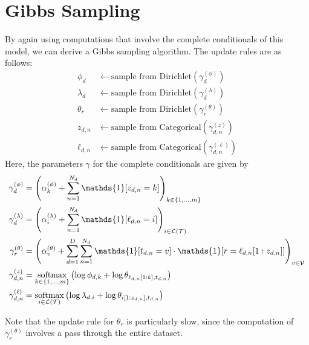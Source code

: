 \documentclass{article}
\newcommand{\indicator}{\mathds{1}}
\begin{document}
\section{Gibbs Sampling}

By again using computations that involve the complete conditionals of this model, we can derive a Gibbs sampling algorithm.
The update rules are as follows:
\begin{align}
\phi_d &\gets \text{sample from Dirichlet}(\gamma^{(\phi)}_d) \\
\lambda_d &\gets \text{sample from Dirichlet}(\gamma^{(\lambda)}_d) \\
\theta_r &\gets \text{sample from Dirichlet}(\gamma^{(\theta)}_r) \\
z_{d,n} &\gets \text{sample from Categorical}(\gamma^{(z)}_{d,n}) \\
\ell_{d,n} &\gets \text{sample from Categorical}(\gamma^{(\ell)}_{d,n})
\end{align}
%
Here, the parameters $\gamma$ for the complete conditionals are given by
\begin{align}
\gamma^{(\phi)}_d
&= \left( \alpha^{(\phi)}_k + \sum_\nWordSlot \indicator[z_{d,n} = k] \right)_\kDepthSet \\
%
\gamma^{(\lambda)}_d
&= \left( \alpha^{(\lambda)}_i + \sum_\nWordSlot \indicator[\ell_{d,n} = i] \right)_\iLeaf \\
%
\gamma^{(\theta)}_r
&= \left( \alpha^{(\theta)}_v + \sum_\dDoc \sum_\nWordSlot \indicator[t_{d,n} = v] \cdot \indicator[r = \ell_{d,n}[1:z_{d,n}]] \right)_\vVocab \\
%
\gamma^{(z)}_{d,n}
&= \softmax_\kDepthSet \left( \log \phi_{d,k} + \log \theta_{\ell_{d,n}[1:k], t_{d,n}} \right) \\
%
\gamma^{(\ell)}_{d,n}
&= \softmax_\iLeaf \left( \log \lambda_{d,i} + \log \theta_{i[1:z_{d,n}], t_{d,n}} \right)
\end{align}

Note that the update rule for $\theta_r$ is particularly slow, since the computation of $\gamma^{(\theta)}_r$ involves a pass through the entire dataset.


%
%
\end{document}
